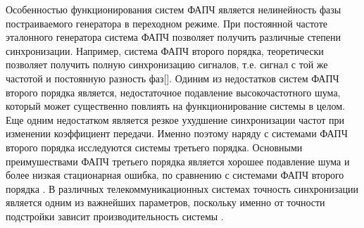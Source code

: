 \documentclass[a4paper,14pt]{article} %
\begin{document}

Особенностью функционирования систем ФАПЧ является нелинейность фазы постраиваемого генератора в переходном режиме. При постоянной частоте эталонного генератора система ФАПЧ позволяет получить различные степени синхронизации. Например, система ФАПЧ второго порядка, теоретически позволяет получить полную синхронизацию сигналов, т.е. сигнал с той же частотой и постоянную разность фаз[]. Одиним из недостатков систем ФАПЧ второго порядка является, недостаточное подавление высокочастотного шума, который может существенно повлиять на функционирование системы в целом. Еще одним недостатком является резкое ухудшение синхронизации частот при изменении коэффициент передачи. Именно поэтому наряду с системами ФАПЧ второго порядка исследуются системы третьего порядка. Основными преимушествами ФАПЧ третьего порядка является хорошее подавление шума и более низкая стационарная ошибка, по сравнению с системами ФАПЧ второго порядка \cite{thirdOrderPLL}. В различных телекоммуникационных системах точность синхронизации является одним из важнейших параметров, поскольку именно от точности подстройки зависит производительность системы \cite{UsageOfThirdOrder1}.
\end{document}
